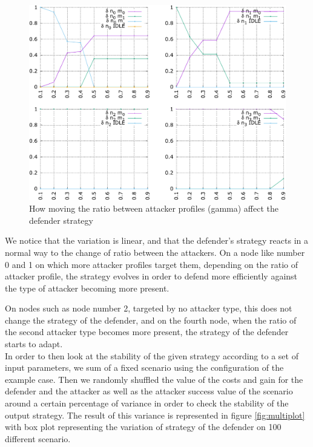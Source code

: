\begin{figure}[h]
    \centering
    \includegraphics[width=1\textwidth]{schema/multiplot_gamma.pdf}
    \caption{How moving the ratio between attacker profiles (gamma) affect the defender strategy}
    \label{fig:gamma}
\end{figure}


We notice that the variation is linear, and that the defender's strategy reacts in a normal way to the change of ratio between the attackers.
On a node like number 0 and 1 on which more attacker profiles target them, depending on the ratio of attacker profile, the strategy evolves in order to defend more efficiently against the type of attacker becoming more present.

On nodes such as node number 2, targeted by no attacker type, this does not change the strategy of the defender, and on the fourth node, when the ratio of the second attacker type becomes more present, the strategy of the defender starts to adapt. \\


In order to then look at the stability of the given strategy according to a set of input parameters, we sum of a fixed scenario using the configuration of the example case. Then we randomly shuffled the value of the costs and gain for the defender and the attacker as well as the attacker success value of the scenario around a certain percentage of variance in order to check the stability of the output strategy. The result of this variance is represented in figure \ref{fig:multiplot} with box plot representing the variation of strategy of the defender on 100 different scenario. 

